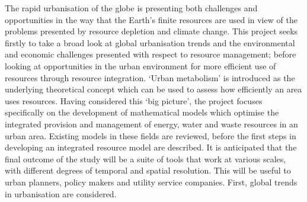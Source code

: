 The rapid urbanisation of the globe is presenting both challenges and opportunities in the way that the Earth's finite resources are used in view of the problems presented by resource depletion and climate change. This project seeks firstly to take a broad look at global urbanisation trends and the environmental and economic challenges presented with respect to resource management; before looking at opportunities in the urban environment for more efficient use of resources through resource integration. `Urban metabolism' is introduced as the underlying theoretical concept which can be used to assess how efficiently an area uses resources. Having considered this `big picture', the project focuses specifically on the development of mathematical models which optimise the integrated provision and management of energy, water and waste resources in an urban area. Existing models in these fields are reviewed, before the first steps in developing an integrated resource model are described. It is anticipated that the final outcome of the study will be a suite of tools that work at various scales, with different degrees of temporal and spatial resolution. This will be useful to urban planners, policy makers and utility service companies. First, global trends in urbanisation are considered.

